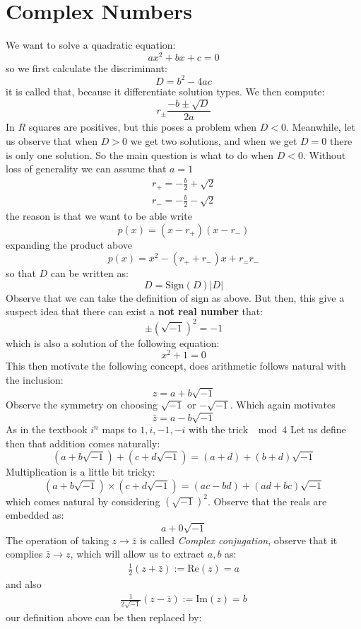 \section{Complex Numbers}
We want to solve a quadratic equation:
\[ ax^2 + bx + c = 0 \]
so we first calculate the discriminant:
\[ D =  b^2 - 4ac \]
it is called that, because it differentiate solution types. We then compute:
\[ r_{\pm} \frac{-b \pm \sqrt{D} }{2a}  \]
In $ R $ squares are positives,  but this poses a problem when $D < 0$. Meanwhile, let us observe that when $ D > 0 $ we get two solutions, and when we get $ D = 0$ there is only one solution. So the main question is what to do when $ D < 0$. Without loss of generality we can assume that $ a=1$
\begin{align*}
r_+ = -\frac{b}{2} + \sqrt{2} \\
r_- = -\frac{b}{2} - \sqrt{2}
\end{align*}  
the reason is that we want to be able write
\[ p(x)= (x -r_+)(x - r_-)\]
expanding the product above
\[ p(x) = x^2 - (r_+ + r_-)x + r_=r_-\]
so that $D$ can be written as:
\[ D = \textrm{Sign}(D)|D| \]
Observe that we can take the definition of sign as above. But then, this give a suspect idea that there can exist a \textbf{not real number} that:
\[ \pm (\sqrt{-1})^2 = -1 \]
which is also a solution of the following equation:
\[ x^2 + 1 = 0 \]
This then motivate the following concept, does arithmetic follows natural with the inclusion:
\[ z = a + b \sqrt{-1} \]
Observe the symmetry on choosing $ \sqrt{-1} $ or $ -\sqrt{-1} $. Which again motivates
\[ \bar{z} = a - b \sqrt{-1} \]
As in the textbook $ i^n$ maps to $1,i,-1,-i$ with the trick $ \mod{4 }$ 
Let us define then that addition comes naturally:
\[ (a+b\sqrt{-1}) + (c+d\sqrt{-1})= (a+d) + (b + d)\sqrt{-1}\]
Multiplication is a little bit tricky:
\[ (a + b\sqrt{-1})\times (c+d\sqrt{-1})  = (ac -bd) + (ad+bc)\sqrt{-1}\] 
which comes natural by considering $ (\sqrt{-1})^2 $.
Observe that the reals are embedded as:
\[  a + 0\sqrt{-1} \] 
The operation of taking $ z \rightarrow \bar{z} $ is called \emph{Complex conjugation}, observe that it complies $ \bar{z} \rightarrow z $, which will allow us to extract $ a,b$ as:
\begin{align*}
\frac{1}{2}(z + \bar{z}) := \textrm{Re}(z) = a
\end{align*}
and also
\begin{align*}
\frac{1}{2\sqrt{-1}}(z - \bar{z}) := \textrm{Im}(z) = b
\end{align*}
our definition above can be then replaced by:
